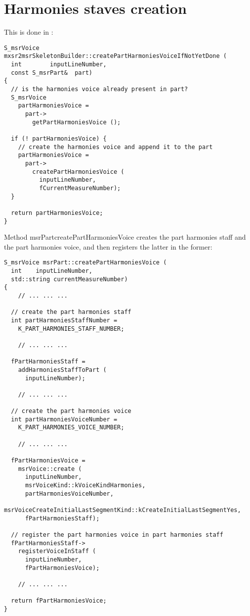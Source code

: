\section{Harmonies staves creation}

This is done in :
\begin{lstlisting}[language=CPlusPlus]
S_msrVoice mxsr2msrSkeletonBuilder::createPartHarmoniesVoiceIfNotYetDone (
  int        inputLineNumber,
  const S_msrPart&  part)
{
  // is the harmonies voice already present in part?
  S_msrVoice
    partHarmoniesVoice =
      part->
        getPartHarmoniesVoice ();

  if (! partHarmoniesVoice) {
    // create the harmonies voice and append it to the part
    partHarmoniesVoice =
      part->
        createPartHarmoniesVoice (
          inputLineNumber,
          fCurrentMeasureNumber);
  }

  return partHarmoniesVoice;
}
\end{lstlisting}

Method {msrPart}{createPartHarmoniesVoice} creates the part harmonies staff and the part harmonies voice, and then registers the latter in the former:
\begin{lstlisting}[language=CPlusPlus]
S_msrVoice msrPart::createPartHarmoniesVoice (
  int    inputLineNumber,
  std::string currentMeasureNumber)
{
	// ... ... ...

  // create the part harmonies staff
  int partHarmoniesStaffNumber =
    K_PART_HARMONIES_STAFF_NUMBER;

	// ... ... ...

  fPartHarmoniesStaff =
    addHarmoniesStaffToPart (
      inputLineNumber);

	// ... ... ...

  // create the part harmonies voice
  int partHarmoniesVoiceNumber =
    K_PART_HARMONIES_VOICE_NUMBER;

	// ... ... ...

  fPartHarmoniesVoice =
    msrVoice::create (
      inputLineNumber,
      msrVoiceKind::kVoiceKindHarmonies,
      partHarmoniesVoiceNumber,
      msrVoiceCreateInitialLastSegmentKind::kCreateInitialLastSegmentYes,
      fPartHarmoniesStaff);

  // register the part harmonies voice in part harmonies staff
  fPartHarmoniesStaff->
    registerVoiceInStaff (
      inputLineNumber,
      fPartHarmoniesVoice);

	// ... ... ...

  return fPartHarmoniesVoice;
}
\end{lstlisting}


